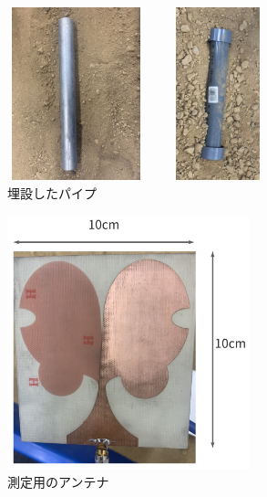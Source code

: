 \documentclass[12pt,a4paper]{jsreport}
\begin{document}
  \begin{figure}[htbp]
    \begin{minipage}[b]{0.5\linewidth}
      \centering
      \includegraphics[height=5cm,width=4cm]{dataimage/exp_image/metalpipe.jpg}
    \end{minipage}
    \begin{minipage}[b]{0.3\linewidth}
      \centering
      \includegraphics[height=5cm,width=4cm]{dataimage/exp_image/plasticpipe.jpg}
    \end{minipage}
    \caption{埋設したパイプ}
    \label{埋設したパイプ}
  \end{figure}  

  \begin{figure}[h]
    \begin{center}
     \includegraphics[width=7cm]{./image/antenna.pdf}
    \caption{測定用のアンテナ  }\label{測定用のアンテナ}
    \end{center}
    \end{figure}
\end{document}
